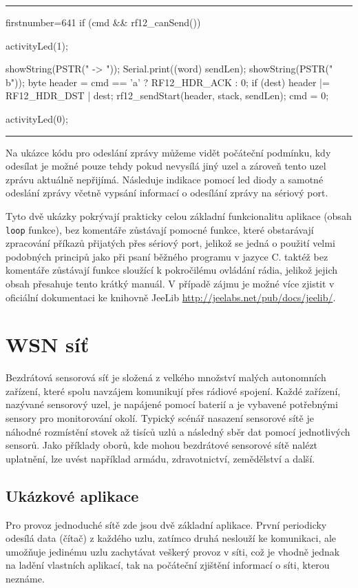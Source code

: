 \documentclass[12pt,titlepage]{article}
\newcommand{\codetitle}[1]{\bigskip \noindent {\scriptsize #1}\hrule}
\begin{document}
\newpage
\codetitle{Zjednodušená ukázka odeslání zprávy v RF12demo}
\begin{cppcode*}{firstnumber=641}
if (cmd && rf12_canSend()) {
    activityLed(1);

    showString(PSTR(" -> "));
    Serial.print((word) sendLen);
    showString(PSTR(" b\n"));
    byte header = cmd == 'a' ? RF12_HDR_ACK : 0;
    if (dest)
        header |= RF12_HDR_DST | dest;
    rf12_sendStart(header, stack, sendLen);
    cmd = 0;

    activityLed(0);
}
\end{cppcode*}
\hrule
\bigskip
Na ukázce kódu pro odeslání zprávy můžeme vidět počáteční podmínku, kdy odesílat je možné pouze tehdy pokud nevysílá jiný uzel a zároveň tento uzel zprávu aktuálně nepřijímá. Následuje indikace pomocí led diody a samotné odeslání zprávy včetně vypsání informací o odesílání zprávy na sériový port.

Tyto dvě ukázky pokrývají prakticky celou základní funkcionalitu aplikace (obsah \texttt{loop} funkce), bez komentáře zůstávají pomocné funkce, které obstarávají zpracování příkazů přijatých přes sériový port, jelikož se jedná o použití velmi podobných principů jako při psaní běžného programu v jazyce C. taktéž bez komentáře zůstávají funkce sloužící k pokročilému ovládání rádia, jelikož jejich obsah přesahuje tento krátký manuál. V případě zájmu je možné více zjistit v oficiální dokumentaci ke knihovně JeeLib \url{http://jeelabs.net/pub/docs/jeelib/}.

\section{WSN síť}

	Bezdrátová sensorová síť je složená z velkého množství malých autonomních zařízení, které spolu navzájem komunikují přes rádiové spojení. Každé zařízení, nazývané sensorový uzel, je napájené pomocí 	baterií a je vybavené potřebnými sensory pro monitorování okolí. Typický scénář nasazení sensorové sítě je náhodné rozmístění stovek až tisíců uzlů a následný sběr dat pomocí jednotlivých sensorů. Jako příklady oborů, kde mohou bezdrátové sensorové sítě nalézt uplatnění, lze uvést například armádu, zdravotnictví, zemědělství a další.

	\subsection{Ukázkové aplikace}
	Pro provoz jednoduché sítě zde jsou dvě základní aplikace. První periodicky odesílá data (čítač) z každého uzlu, zatímco druhá neslouží ke komunikaci, ale umožňuje jedinému uzlu zachytávat veškerý provoz v síti, což je vhodně jednak na ladění vlastních aplikací, tak na počáteční zjištění informací o síti, kterou neznáme.
\end{document}
